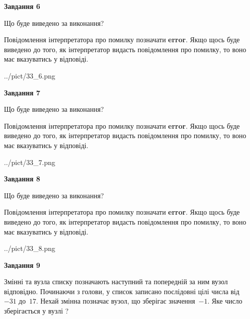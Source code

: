 \documentclass[12pt, ukrainian]{article}
\begin{document}
{\begin {large}
{\begin {center}\textbf{Завдання 6}\end {center}}\par
Що буде виведено за виконання?

Повідомлення інтерпретатора про помилку позначати \textbf{error}.
Якщо щось буде виведено до того, як інтерпретатор видасть повідомлення про помилку, 
то воно має вказуватись у відповіді. \par


\begin{center}
	{../pict/33_6.png}
\end{center}
\newpage

{\begin {center}\textbf{Завдання 7}\end {center}}\par
Що буде виведено за виконання?

Повідомлення інтерпретатора про помилку позначати \textbf{error}.
Якщо щось буде виведено до того, як інтерпретатор видасть повідомлення про помилку, 
то воно має вказуватись у відповіді. \par


\begin{center}
	{../pict/33_7.png}
\end{center}
\newpage

{\begin {center}\textbf{Завдання 8}\end {center}}\par
Що буде виведено за виконання?

Повідомлення інтерпретатора про помилку позначати \textbf{error}.
Якщо щось буде виведено до того, як інтерпретатор видасть повідомлення про помилку, 
то воно має вказуватись у відповіді. \par


\begin{center}
	{../pict/33_8.png}
\end{center}
\newpage

{\begin {center}\textbf{Завдання 9}\end {center}}\par
Змінні  та  вузла списку позначають наступний та попередній за ним вузол відповідно. Починаючи з голови, у список записано послідовні цілі числа від~$-31$ до~$17$. Нехай змінна  позначає вузол, що зберігає значення~$-1$.
Яке число зберігається у вузлі  ?\par
\newpage


\end{large}}
\end{document}
